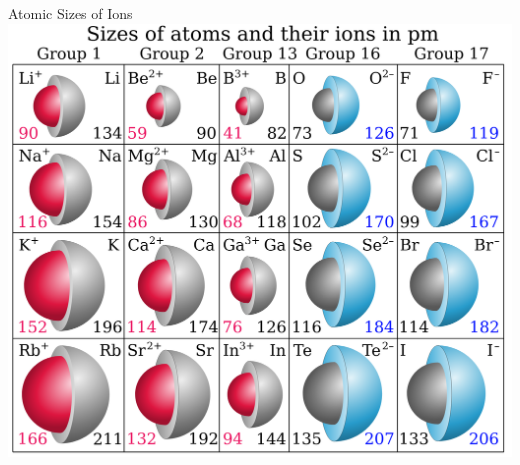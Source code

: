 \documentclass[11pt]{beamer}
\begin{document}
\begin{frame}{Atomic Sizes of Ions}
  \centering
  \includegraphics[width=0.8\linewidth]{ion_radii}
\end{frame}
\end{document}
